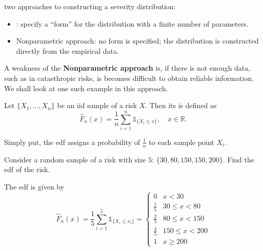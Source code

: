 \documentclass[notoc,notitlepage]{tufte-book}
\begin{document}
 two approaches to constructing a severity distribution:
\begin{itemize}
  \item {}: specify a ``form'' for the distribution with a finite number of parameters.
  \item Nonparametric approach: no form is specified; the distribution is constructed directly from the empirical data.
\end{itemize}

A weakness of the \textbf{Nonparametric approach} is, if there is not enough data, such as in catasthropic risks, is becomes difficult to obtain reliable information. We shall look at one such example in this approach.

\begin{defn}\label{defn:empirical_distribution_function}
  Let $\{ X_1, \ldots, X_n \}$ be an iid sample of a risk $X$. Then its  is defined as
  \begin{equation*}
    \hat{F}_n(x) = \frac{1}{n} \sum_{i=1}^{n}  \mathbb{1}_{\{X_i \leq x\}}, \quad x \in \mathbb{R}.
  \end{equation*}
\end{defn}

\begin{remark}
  Simply put, the edf assigns a probability of $\frac{1}{n}$ to each sample point $X_i$.
\end{remark}

\begin{eg}
  Consider a random sample of a risk with size $5$: $\{ 30, 80, 150, 150, 200 \}$. Find the edf of the risk.
\end{eg}

\begin{solution}
  The edf is given by
  \begin{equation*}
    \hat{F}_n(x) = \frac{1}{5} \sum_{i=1}^{5} \mathbb{1}_{\{ X_i \leq x_i \}} = \begin{cases}
      0           & x < 30 \\
      \frac{1}{5} & 30 \leq x < 80 \\
      \frac{2}{5} & 80 \leq x < 150 \\
      \frac{4}{5} & 150 \leq x < 200 \\
      1           & x \geq 200
    \end{cases}
  \end{equation*}
\end{solution}
\end{document}
